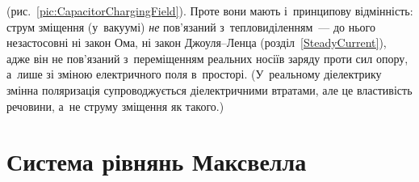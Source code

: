(рис.~\ref{pic:CapacitorChargingField}). Проте вони мають і~принципову відмінність:
струм зміщення (у~вакуумі) \emph{не} пов'язаний з~тепловиділенням~--- до нього
незастосовні ні закон Ома, ні закон Джоуля--Ленца (розділ~\ref{SteadyCurrent}), адже він
не пов'язаний з~переміщенням реальних носіїв заряду проти сил опору, а~лише зі зміною
електричного поля в~просторі. (У~реальному діелектрику змінна поляризація
супроводжується діелектричними втратами, але це властивість речовини, а~не струму
зміщення як такого.)




\section{Система рівнянь Максвелла}\hypertarget{maxwell-equations-system}{}


